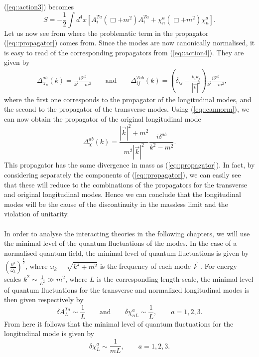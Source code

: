 \documentclass{article}
\begin{document}
(\ref{eq::action3}) becomes 
\begin{equation}\label{eq::action4}
    S=-\frac{1}{2}\int d^4x\left[A_i^{Ta}(\Box+m^2)A_i^{Ta}+\chi_n^a(\Box+m^2)\chi_n^a\right].
\end{equation}
Let us now see from where the problematic term in the propagator (\ref{eq::propagator}) comes from. Since the modes are now canonically normalised, it is easy to read of the corresponding propagators from (\ref{eq::action4}). They are given by
\begin{equation}
    \begin{split}
        &\Delta_{\chi_n}^{ab}(k)=\frac{i\delta^{ab}}{k^2-m^2}\qquad\text{and}\qquad
        \Delta_{ij}^{Tab}(k)=\left(\delta_{ij}-\frac{k_ik_j}{|\vec{k}|^2}\right)\frac{i\delta^{ab}}{k^2-m^2},
    \end{split}
\end{equation}
where the first one corresponds to the propagator of the longitudinal modes, and the second to the propagator of the transverse modes. Using (\ref{eq::cannorm}), we can now obtain the propagator of the original longitudinal mode
\begin{equation}
    \Delta_{\chi}^{ab}(k)=\frac{|\vec{k}|^2+m^2}{m^2|\vec{k}|^2}\frac{i\delta^{ab}}{k^2-m^2}.
\end{equation}
This propagator has the same divergence in mass as (\ref{eq::propagator}). In fact, by considering separately the components of (\ref{eq::propagator}), we can easily see that these will reduce to the combinations of the propagators for the transverse and original longitudinal modes. Hence we can conclude that the longitudinal modes will be the cause of the discontinuity in the massless limit and the violation of unitarity. 
\\\\
In order to analyse the interacting theories in the following chapters, we will use the minimal level of the quantum fluctuations of the modes. In the case of a normalised quantum field, the minimal level of quantum fluctuations is given by $\left(\frac{k^3}{\omega_k}\right)^{\frac{1}{2}}$, where $\omega_k=\sqrt{k^2+m^2}$ is the frequency of each mode $\vec{k}$ \cite{QFTCS}. For energy scales $k^2\sim\frac{1}{L^2}\gg m^2$, where $L$ is the corresponding length-scale, the minimal level of quantum fluctuations for the transverse and normalized longitudinal modes is then given respectively by 
\begin{equation}\label{eq::quanfluct}
    \delta A_L^{Ta}\sim\frac{1}{L} \qquad\text{and}\qquad \delta\chi_{nL}^a\sim\frac{1}{L}, \quad\text{}\quad a=1,2,3.
\end{equation}
From here it follows that the minimal level of quantum fluctuations for the longitudinal mode is given by
\begin{equation}
    \delta\chi_L^a\sim\frac{1}{mL},\qquad a=1,2,3.
\end{equation}
\end{document}
